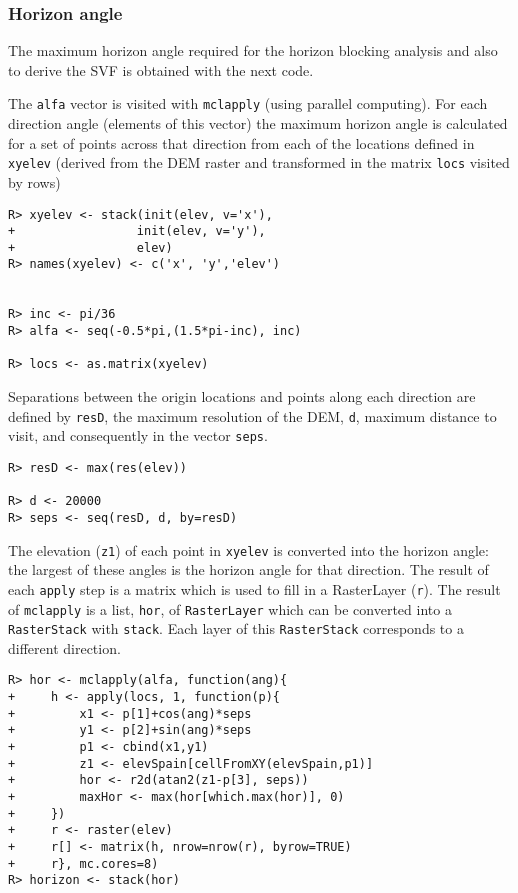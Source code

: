 \documentclass[authoryear, sort&compress]{elsarticle}
\begin{document}
\subsubsection{Horizon angle}
\label{sec-1-5-1}

The maximum horizon angle required for the horizon blocking analysis
and also to derive the SVF is obtained with the next code. 

The \texttt{alfa} vector is visited with \texttt{mclapply} (using parallel
computing). For each direction angle (elements of this vector) the
maximum horizon angle is calculated for a set of points across that
direction from each of the locations defined in \texttt{xyelev} (derived
from the DEM raster and transformed in the matrix \texttt{locs} visited
by rows)

\lstset{language=R,numbers=none}
\begin{lstlisting} 
R> xyelev <- stack(init(elev, v='x'),
+                 init(elev, v='y'),
+                 elev)
R> names(xyelev) <- c('x', 'y','elev')


R> inc <- pi/36
R> alfa <- seq(-0.5*pi,(1.5*pi-inc), inc)

R> locs <- as.matrix(xyelev)
\end{lstlisting}

Separations between the origin locations and points along each
direction are defined by \texttt{resD}, the maximum resolution of the
DEM, \texttt{d}, maximum distance to visit, and consequently in the
vector \texttt{seps}.

\lstset{language=R,numbers=none}
\begin{lstlisting} 
R> resD <- max(res(elev))

R> d <- 20000
R> seps <- seq(resD, d, by=resD)
\end{lstlisting}

The elevation (\texttt{z1}) of each point in \texttt{xyelev} is converted
into the horizon angle: the largest of these angles is the horizon
angle for that direction. The result of each \texttt{apply} step is a
matrix which is used to fill in a RasterLayer (\texttt{r}). The result
of \texttt{mclapply} is a list, \texttt{hor}, of \texttt{RasterLayer} which
can be converted into a \texttt{RasterStack} with \texttt{stack}. Each
layer of this \texttt{RasterStack} corresponds to a different direction.

\lstset{language=R,numbers=none}
\begin{lstlisting} 
R> hor <- mclapply(alfa, function(ang){
+     h <- apply(locs, 1, function(p){
+         x1 <- p[1]+cos(ang)*seps
+         y1 <- p[2]+sin(ang)*seps
+         p1 <- cbind(x1,y1)
+         z1 <- elevSpain[cellFromXY(elevSpain,p1)]
+         hor <- r2d(atan2(z1-p[3], seps))
+         maxHor <- max(hor[which.max(hor)], 0)
+     })
+     r <- raster(elev)
+     r[] <- matrix(h, nrow=nrow(r), byrow=TRUE)
+     r}, mc.cores=8)
R> horizon <- stack(hor)
\end{lstlisting}
\end{document}
